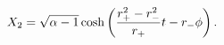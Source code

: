 \begin{equation}
X_2 = \sqrt{\alpha-1} \cosh\left( {r_+^2 - r_-^2 \over r_+} t - r_-
\phi \right).
\end{equation}

